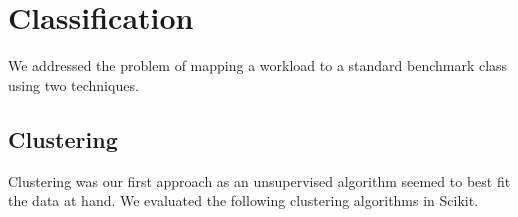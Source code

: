 \section{Classification} \label{sec:classfication}

We addressed the problem of mapping a workload to a standard benchmark class
using two techniques. 

\subsection{Clustering}
\label{sec:clustering}

Clustering was our first approach as an unsupervised algorithm seemed to best
fit the data at hand. 
We evaluated the following clustering algorithms in Scikit.\\

